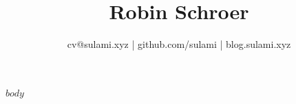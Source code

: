 \documentclass[a4paper,10pt]{scrartcl}
\title{\bfseries Robin Schroer}
\author{cv@sulami.xyz | github.com/sulami | blog.sulami.xyz}
\date{}
\begin{document}
\maketitle

$body$
\end{document}
